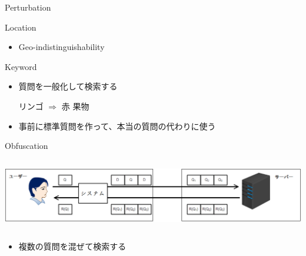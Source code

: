 \documentclass[14pt,xcolor=dvipsnames,table,dvipdfmx]{beamer}
\begin{document}
\begin{frame}{Perturbation}
	\begin{exampleblock}{Location}
		\begin{itemize}
			\item Geo-indistinguishability \cite{andres_geo-indistinguishability:_2013}
		\end{itemize}
	\end{exampleblock}
	\begin{exampleblock}{Keyword}
		\begin{itemize}
			\item 質問を一般化して検索する\cite{arampatzis_query_2012}
				\begin{center}
					リンゴ $\Rightarrow$ 赤 果物 
				\end{center}
			\item 事前に標準質問を作って、本当の質問の代わりに使う \cite{murugesan_providing_2009}
		\end{itemize}
	\end{exampleblock}
\end{frame}

\begin{frame}{Obfuscation}
    \begin{columns}[t]
        \begin{column}{1\textwidth} %
            \includegraphics[width=\columnwidth]{photo4.png}
		\end{column}
    \end{columns}
	\begin{block}{} 
		\begin{itemize}
			\item 複数の質問を混ぜて検索する
		\end{itemize}
	\end{block}
\end{frame}
\end{document}
